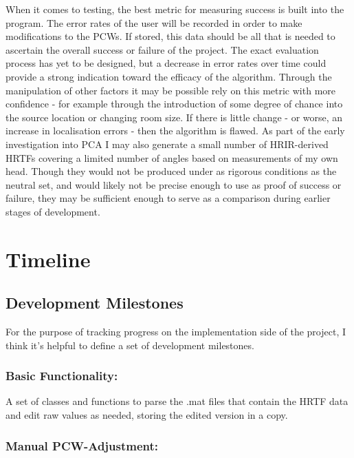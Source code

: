 \documentclass[10pt, oneside, a4paper, draft]{scrartcl}
\begin{document}
When it comes to testing, the best metric for measuring success is built into the program. The error rates of the user will be recorded in order to make modifications to the PCWs. If stored, this data should be all that is needed to ascertain the overall success or failure of the project. The exact evaluation process has yet to be designed, but a decrease in error rates over time could provide a strong indication toward the efficacy of the algorithm. Through the manipulation of other factors it may be possible rely on this metric with more confidence - for example through the introduction of some degree of chance into the source location or changing room size. If there is little change - or worse, an increase in localisation errors - then the algorithm is flawed. As part of the early investigation into PCA I may also generate a small number of HRIR-derived HRTFs covering a limited number of angles based on measurements of my own head. Though they would not be produced under as rigorous conditions as the neutral set, and would likely not be precise enough to use as proof of success or failure, they may be sufficient enough to serve as a comparison during earlier stages of development. 

\section*{Timeline}



\subsection*{Development Milestones}

For the purpose of tracking progress on the implementation side of the project, I think it's helpful to define a set of development milestones. 


\subsubsection*{Basic Functionality:}

A set of classes and functions to parse the .mat files that contain the HRTF data and edit raw values as needed, storing the edited version in a copy. 

\subsubsection*{Manual PCW-Adjustment:}
\end{document}
